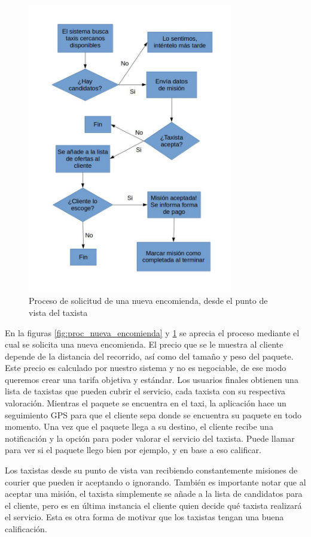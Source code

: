 \begin{figure}[htb]
\centering
\includegraphics[width=0.8\textwidth]{./img/taxista.jpg}
\caption{Proceso de solicitud de una nueva encomienda, desde el punto de vista del taxista} \label{fig:proc_taxista}
\end{figure}


En la figuras \ref{fig:proc_nueva_encomienda} y \ref{fig:proc_taxista} se aprecia el proceso mediante el cual se solicita una nueva encomienda. El precio que se le muestra al cliente depende de la distancia del recorrido, así como del tamaño y peso del paquete. Este precio es calculado por nuestro sistema y no es negociable, de ese modo queremos crear una tarifa objetiva y estándar. Los usuarios finales obtienen una lista de taxistas que pueden cubrir el servicio, cada taxista con su respectiva valoración. Mientras el paquete se encuentra en el taxi, la aplicación hace un seguimiento GPS para que el cliente sepa donde se encuentra su paquete en todo momento. Una vez que el paquete llega a su destino, el cliente recibe una notificación y la opción para poder valorar el servicio del taxista. Puede llamar para ver si el paquete llego bien por ejemplo, y en base a eso calificar.

Los taxistas desde su punto de vista van recibiendo constantemente misiones de courier que pueden ir aceptando o ignorando. También es importante notar que al aceptar una misión, el taxista simplemente se añade a la lista de candidatos para el cliente, pero es en última instancia el cliente quien decide qué taxista realizará el servicio. Esta es otra forma de motivar que los taxistas tengan una buena calificación.